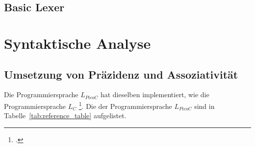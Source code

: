 \begin{grammar}
  \toprule
  \bottomrule
\end{grammar}


\subsection{Basic Lexer}
\section{Syntaktische Analyse}
\label{sec:syntaktische_analyse}

\subsection{Umsetzung von Präzidenz und Assoziativität}
\label{sec:umsetzung_von_präzidenz}

Die Programmiersprache $L_{PicoC}$ hat dieselben  implementiert, wie die Programmiersprache $L_C$ \footcite{noauthor_c_nodate}. Die  der Programmiersprache $L_{PicoC}$ sind in Tabelle~\ref{tab:reference_table} aufgelistet.

